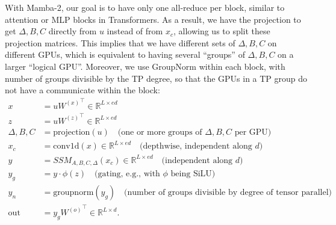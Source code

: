 With Mamba-2, our goal is to have only one all-reduce per block, similar to attention or MLP blocks in Transformers.
As a result, we have the projection to get $\Delta, B, C$ directly from $u$ instead of from $x_c$, allowing us to split these projection matrices.
This implies that we have different sets of $\Delta, B, C$ on different GPUs, which is equivalent to having several ``groups'' of $\Delta, B, C$ on a larger ``logical GPU''.
Moreover, we use GroupNorm within each block, with number of groups divisible by the TP degree, so that the GPUs in a TP group do not have a communicate within the block:
\begin{align*}
   x &= u {W^{(x)}}^\top \in \mathbb{R}^{L \times ed} \\
   z &= u {W^{(z)}}^\top \in \mathbb{R}^{L \times ed} \\
   \Delta, B, C &= \text{projection}(u) \quad \text{(one or more groups of $\Delta, B, C$ per GPU)} \\
   x_c &= \mathrm{conv1d}(x) \in \mathbb{R}^{L \times ed} \quad \text{(depthwise, independent along $d$)} \\
   y &= SSM_{A, B, C, \Delta}(x_c) \in \mathbb{R}^{L \times ed} \quad \text{(independent along $d$)} \\
   y_g &= y \cdot \phi(z)  \quad \text{(gating, e.g., with $\phi$ being SiLU)} \\
   y_n &= \mathrm{groupnorm}(y_g) \quad \text{(number of groups divisible by degree of tensor parallel)} \\
   \mathrm{out} &= y_g {W^{(o)}}^\top \in \mathbb{R}^{L \times d}.
\end{align*}

